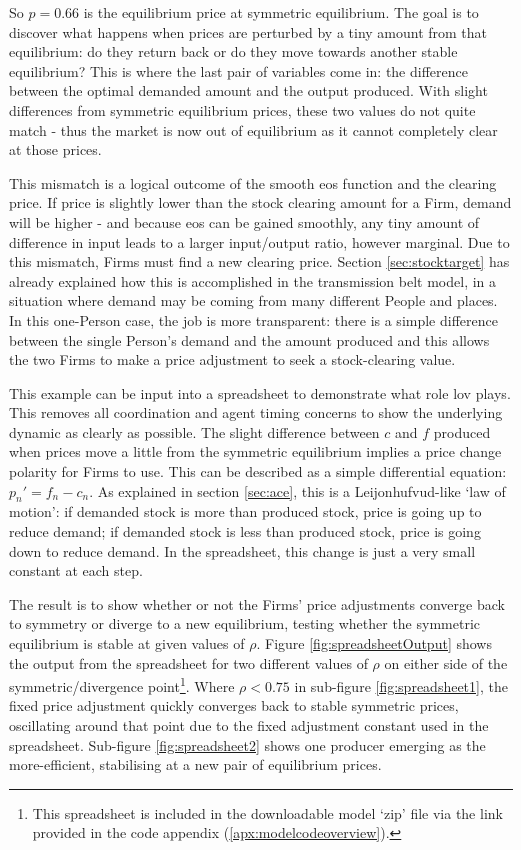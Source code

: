 So $p=0.66$ is the equilibrium price at symmetric equilibrium. The goal is to discover what happens when prices are perturbed by a tiny amount from that equilibrium: do they return back or do they move towards another stable equilibrium? This is where the last pair of variables come in: the difference between the optimal demanded amount and the output produced. With slight differences from symmetric equilibrium prices, these two values do not quite match - thus the market is now out of equilibrium as it cannot completely clear at those prices. 

This mismatch is a logical outcome of the smooth \gls{eos} function and the clearing price. If price is slightly lower than the stock clearing amount for a Firm, demand will be higher - and because \gls{eos} can be gained smoothly, any tiny amount of difference in input leads to a larger input/output ratio, however marginal. Due to this mismatch, Firms must find a new clearing price. Section \ref{sec:stocktarget} has already explained how this is accomplished in the transmission belt model, in a situation where demand may be coming from many different People and places. In this one-Person case, the job is more transparent: there is a simple difference between the single Person's demand and the amount produced and this allows the two Firms to make a price adjustment to seek a stock-clearing value. 

This example can be input into a spreadsheet to demonstrate what role \gls{lov} plays. This removes all coordination and agent timing concerns to show the underlying dynamic as clearly as possible. The slight difference between $c$ and $f$ produced when prices move a little from the symmetric equilibrium implies a price change polarity for Firms to use. This can be described as a simple differential equation: $p_n' = f_n - c_n$. As explained in section \ref{sec:ace}, this is a Leijonhufvud-like `law of motion': if demanded stock is more than produced stock, price is going up to reduce demand; if demanded stock is less than produced stock, price is going down to reduce demand. In the spreadsheet, this change is just a very small constant at each step. 

The result is to show whether or not the Firms' price adjustments converge back to symmetry or diverge to a new equilibrium, testing whether the symmetric equilibrium is stable at given values of $\rho$. Figure \ref{fig:spreadsheetOutput} shows the output from the spreadsheet for two different values of $\rho$ on either side of the symmetric/divergence point\footnote{This spreadsheet is included in the downloadable model `zip' file via the link provided in the code appendix (\ref{apx:modelcodeoverview}).}. Where $\rho < 0.75$ in sub-figure \ref{fig:spreadsheet1}, the fixed price adjustment quickly converges back to stable symmetric prices, oscillating around that point due to the fixed adjustment constant used in the spreadsheet. Sub-figure \ref{fig:spreadsheet2} shows one producer emerging as the more-efficient, stabilising at a new pair of equilibrium prices.

